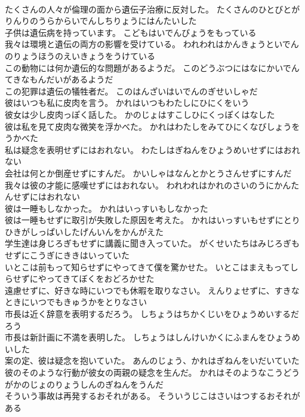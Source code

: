 \documentclass[8pt]{extreport}
\begin{document}
\begin{CJK}{UTF8}{min}
\\	たくさんの人々が倫理の面から遺伝子治療に反対した。	たくさんのひとびとがりんりのうらからいでんしちりょうにはんたいした 
\\	子供は遺伝病を持っています。	こどもはいでんびょうをもっている 
\\	我々は環境と遺伝の両方の影響を受けている。	われわれはかんきょうといでんのりょうほうのえいきょうをうけている 
\\	この動物には何か遺伝的な問題があるようだ。	このどうぶつにはなにかいでんてきなもんだいがあるようだ 
\\	この犯罪は遺伝の犠牲者だ。	このはんざいはいでんのぎせいしゃだ 
\\	彼はいつも私に皮肉を言う。	かれはいつもわたしにひにくをいう 
\\	彼女は少し皮肉っぽく話した。	かのじょはすこしひにくっぽくはなした 
\\	彼は私を見て皮肉な微笑を浮かべた。	かれはわたしをみてひにくなびしょうをうかべた 
\\	私は疑念を表明せずにはおれない。	わたしはぎねんをひょうめいせずにはおれない 
\\	会社は何とか倒産せずにすんだ。	かいしゃはなんとかとうさんせずにすんだ 
\\	我々は彼の才能に感嘆せずにはおれない。	われわれはかれのさいのうにかんたんせずにはおれない 
\\	彼は一睡もしなかった。	かれはいっすいもしなかった 
\\	彼は一睡もせずに取引が失敗した原因を考えた。	かれはいっすいもせずにとりひきがしっぱいしたげんいんをかんがえた 
\\	学生達は身じろぎもせずに講義に聞き入っていた。	がくせいたちはみじろぎもせずにこうぎにききはいっていた 
\\	いとこは前もって知らせずにやってきて僕を驚かせた。	いとこはまえもってしらせずにやってきてぼくをおどろかせた 
\\	遠慮せずに、好きな時にいつでも休暇を取りなさい。	えんりょせずに、すきなときにいつでもきゅうかをとりなさい 
\\	市長は近く辞意を表明するだろう。	しちょうはちかくじいをひょうめいするだろう 
\\	市長は新計画に不満を表明した。	しちょうはしんけいかくにふまんをひょうめいした 
\\	案の定、彼は疑念を抱いていた。	あんのじょう、かれはぎねんをいだいていた 
\\	彼のそのような行動が彼女の両親の疑念を生んだ。	かれはそのようなこうどうがかのじょのりょうしんのぎねんをうんだ 
\\	そういう事故は再発するおそれがある。	そういうじこはさいはつするおそれがある 

\end{CJK}
\end{document}
